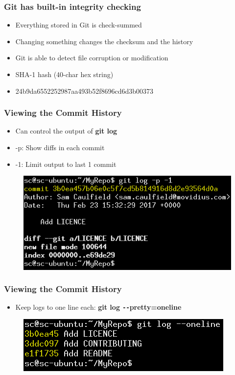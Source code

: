 \documentclass{beamer}
\begin{document}
\begin{frame}
	\frametitle{Git has built-in integrity checking}
	\begin{itemize}
		\item{Everything stored in Git is check-summed}
		\item{Changing something changes the checksum and the history}
		\item{Git is able to detect file corruption or modification}
		\item{SHA-1 hash (40-char hex string)}
		\item{24b9da6552252987aa493b52f8696cd6d3b00373}
	\end{itemize}

\end{frame}

\begin{frame}
	\frametitle{Viewing the Commit History}
	\begin{itemize}
		\item{Can control the output of \textbf{git log}}
		\item{-p: Show diffs in each commit}
		\item{-1: Limit output to last 1 commit}
	\end{itemize}
	\begin{figure}
		\includegraphics[scale=0.6]{Viewing_the_Commit_History-1.png}
	\end{figure}
\end{frame}

\begin{frame}
	\frametitle{Viewing the Commit History}
	\begin{itemize}
		\item{Keep logs to one line each: \textbf{git log \texttt{-{}-}pretty=oneline}}
	\end{itemize}
	\begin{figure}
		\includegraphics[scale=0.6]{Viewing_the_Commit_History-2.png}
	\end{figure}
\end{frame}
\end{document}

